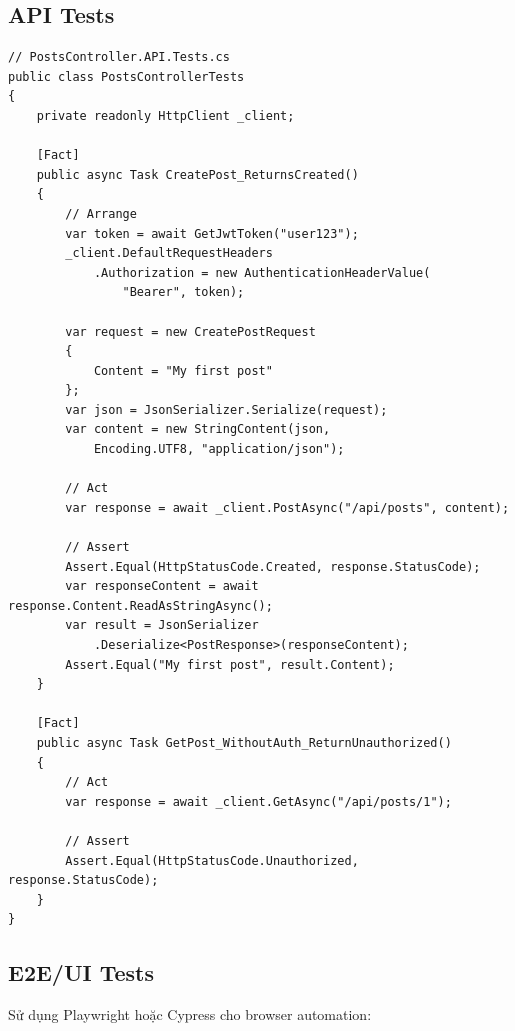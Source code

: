 \subsection{API Tests}

\begin{verbatim}
// PostsController.API.Tests.cs
public class PostsControllerTests
{
    private readonly HttpClient _client;
    
    [Fact]
    public async Task CreatePost_ReturnsCreated()
    {
        // Arrange
        var token = await GetJwtToken("user123");
        _client.DefaultRequestHeaders
            .Authorization = new AuthenticationHeaderValue(
                "Bearer", token);
        
        var request = new CreatePostRequest 
        { 
            Content = "My first post" 
        };
        var json = JsonSerializer.Serialize(request);
        var content = new StringContent(json, 
            Encoding.UTF8, "application/json");
        
        // Act
        var response = await _client.PostAsync("/api/posts", content);
        
        // Assert
        Assert.Equal(HttpStatusCode.Created, response.StatusCode);
        var responseContent = await response.Content.ReadAsStringAsync();
        var result = JsonSerializer
            .Deserialize<PostResponse>(responseContent);
        Assert.Equal("My first post", result.Content);
    }
    
    [Fact]
    public async Task GetPost_WithoutAuth_ReturnUnauthorized()
    {
        // Act
        var response = await _client.GetAsync("/api/posts/1");
        
        // Assert
        Assert.Equal(HttpStatusCode.Unauthorized, response.StatusCode);
    }
}
\end{verbatim}

\subsection{E2E/UI Tests}

Sử dụng Playwright hoặc Cypress cho browser automation:

